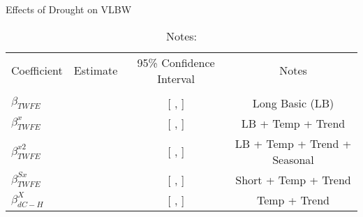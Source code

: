 \begin{table}[!ht]
\centering
\caption{Effects of Drought on VLBW}\label{tab:twfe_vlbw_test}
\fontsize{10pt}{12pt}\selectfont
\begin{tabular}{lccc}
\toprule
 \multicolumn{1}{c}{Coefficient}  &\multicolumn{1}{c}{Estimate}&\multicolumn{1}{c}{95\% Confidence Interval}&\multicolumn{1}{c}{Notes}\\\cmidrule(lr){2-2}\cmidrule(lr){3-3}\cmidrule(lr){4-4} \\
\midrule
 $ \beta_{TWFE} $ &   & [  ,   ] & Long Basic (LB) \\
 $ \beta^{x}_{TWFE} $ &   &  [  ,    ] & LB + Temp + Trend \\
 $ \beta^{x2}_{TWFE} $ &   & [  ,    ] & LB + Temp + Trend + Seasonal \\
 $ \beta^{Sx}_{TWFE} $ &   & [  ,    ] & Short + Temp + Trend \\
 $ \beta^{X}_{dC-H} $ &   & [  ,   ] & Temp + Trend \\
\bottomrule
\end{tabular}
\caption*{\footnotesize{Notes:}}
\end{table}
